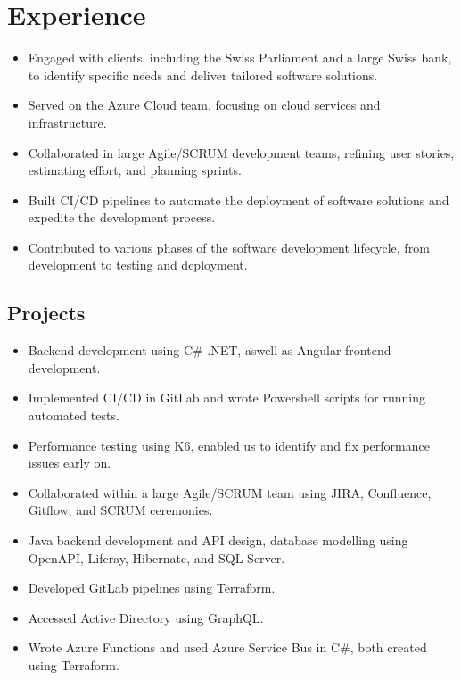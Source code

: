 \section{Experience}
\begin{itemize}
    \item Engaged with clients, including the Swiss Parliament and a large Swiss bank, to identify specific needs and deliver tailored software solutions.
    \item Served on the Azure Cloud team, focusing on cloud services and infrastructure.
    \item Collaborated in large Agile/SCRUM development teams, refining user stories, estimating effort, and planning sprints.
    \item Built CI/CD pipelines to automate the deployment of software solutions and expedite the development process.
    \item Contributed to various phases of the software development lifecycle, from development to testing and deployment.
\end{itemize}
\subsection*{Projects}
\begin{itemize}
    \item Backend development using C\# .NET, aswell as Angular frontend development.
    \item Implemented CI/CD in GitLab and wrote Powershell scripts for running automated tests.
    \item Performance testing using K6, enabled us to identify and fix performance issues early on.
\end{itemize}
\dottedline
{}
\begin{itemize}
    \item Collaborated within a large Agile/SCRUM team using JIRA, Confluence, Gitflow, and SCRUM ceremonies.
    \item Java backend development and API design, database modelling using OpenAPI, Liferay, Hibernate, and SQL-Server.
\end{itemize}
\dottedline
{}
\begin{itemize}
    \item Developed GitLab pipelines using Terraform.
    \item Accessed Active Directory using GraphQL.
    \item Wrote Azure Functions and used Azure Service Bus in C\#, both created using Terraform.
\end{itemize}

